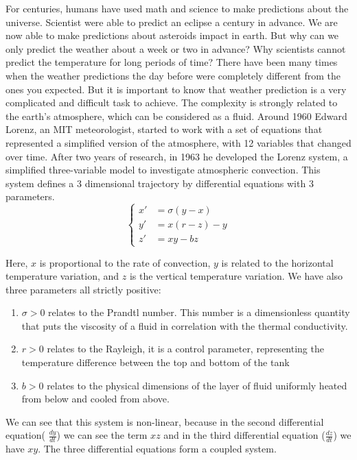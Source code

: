 \documentclass[12pt]{article}
\begin{document}
	For centuries, humans have used math and science to make predictions about the universe. Scientist were able to predict an eclipse a century in advance. We are now able to make predictions about asteroids impact in earth. But why can we only predict the weather about a week or two in advance? Why scientists cannot predict the temperature for long periods of time? There have been many times when the weather predictions the day before were completely different from the ones you expected. But it is important to know that weather prediction is a very complicated and difficult task to achieve. The complexity is strongly related to the earth's atmosphere, which can be considered as a fluid. 
	Around 1960 Edward Lorenz, an MIT meteorologist, started to work with a set of equations that represented a simplified version of the atmosphere, with 12 variables that changed over time. After two years of research, in 1963 he developed the Lorenz system, a simplified three-variable model to investigate atmospheric convection. This system defines a 3 dimensional trajectory by differential equations with 3 parameters.
	$$
	\begin{cases}
		
		x'&=\sigma(y-x) \\
		y'&=x(r-z)-y \\
		z'&=xy-bz
		
	\end{cases}
	$$
	
	\noindent Here, $x$ is proportional to the rate of convection, $y$ is related to the horizontal temperature variation, and $z$ is the vertical temperature variation.
	We have also three parameters all strictly positive:
	\begin{enumerate}[label=\textbullet]
		\item $\sigma > 0$  relates to the Prandtl number. This number is a dimensionless quantity that puts the viscosity of a fluid in correlation with the thermal conductivity.
		\item $r > 0$  relates to the Rayleigh, it is a control parameter, representing the temperature difference between the top and bottom of the tank
		\item $b > 0$ relates to the physical dimensions of the layer of fluid uniformly heated from below and cooled from above.
	\end{enumerate}
	
	\noindent We can see that this system is non-linear, because in the second differential equation( $\frac{dy}{dt}$) we can see the term $xz$ and in the third differential equation ($\frac{dz}{dt}$) we have $xy$. The three differential equations form a coupled system. 
	
\end{document}
